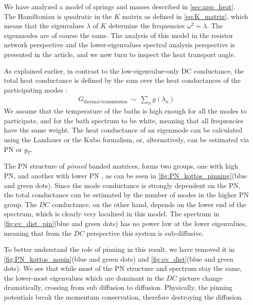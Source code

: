 We have analyzed a model of springs and masses described in \autoref{sec:app_heat}.
The Hamiltonian is quadratic in the $K$ matrix as defined in \autoref{eq:K_matrix},
which means that the eigenvalues $\lambda$ of $K$ determine the frequencies $\omega^2 = \lambda$.
The eigenmodes are of course the same. The analysis of this model in the resistor network perspective
and the lower-eigenvalues spectral analysis perspective is presented in the article, and we now
turn to inspect the heat transport angle.


As explained earlier, in contrast to the low-eigenvalue-only DC conductance, 
the total heat conductance is defined by the
sum over the heat conductances of the participating modes \cite{dhar_heat_2001,lepri_heat_2007}:
%
\begin{align}
G_{\textrm{thermal-transmission}} \ \sim\ \sum_n g(\lambda_n)
\end{align}
%
We assume that the temperature of the baths is high enough for all the modes to
participate, and for the bath spectrum to be white, meaning that all frequencies
have the same weight. The heat conductance of an eigenmode can be calculated
using the Landauer or the Kubo formalism, or, alternatively, can be estimated
via PN or $g_T$.


The PN structure of \emph{pinned}\cite{roy_role_2008} banded matrices,
forms two groups, one with high PN, and another with lower PN \cite{bodyfelt_unpub},
as can be seen in \autoref{fig:PN_kottos_pinning}(blue and green dots). Since the mode conductance 
is strongly dependent on the PN, the total conductance can be estimated
by the number of modes in the higher PN group. The $DC$ conductance, on the
other hand, depends on the lower end of the spectrum, which is clearly very localized
in this model. The spectrum in \autoref{fig:ev_dist_pin}(blue and green dots) has no power law
at the lower eigenvalues, meaning that from the $DC$ perspective this system is sub-diffusive.



To better understand the role of pinning in this result, we have
removed it in \autoref{fig:PN_kottos_nopin}(blue and green dots) and 
\autoref{fig:ev_dist}(blue and green dots). We see that 
while most of the PN structure and spectrum stay the same, the lower-most eigenvalues
which are dominant in the $DC$ picture change dramatically, crossing from sub diffusion
to diffusion. Physically, the pinning potentials break the momentum conservation,
therefore destroying the diffusion.



